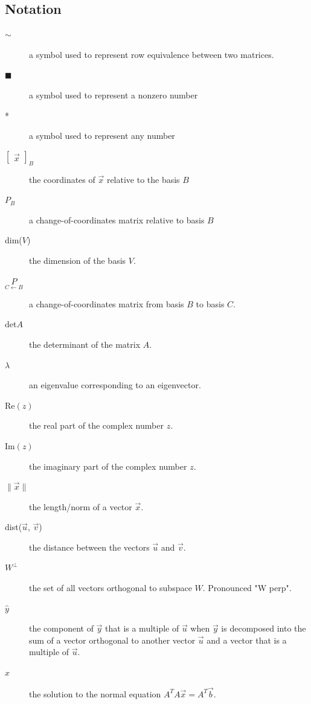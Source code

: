\documentclass[a4paper,12pt]{article}
\theoremstyle{definition}
\theoremstyle{definition}
\newcommand{\basiscoordvec}[2]{
	\begin{bmatrix}
		\vec{#1}
	\end{bmatrix}_#2
}
\newcommand{\chngbasismat}[2]{
	\underset{#2 \leftarrow #1}{P}
}
\newcommand{\norm}[1]{\lVert #1 \rVert}
\newcommand{\normvec}[1]{\norm{\vec{#1}}}
\newcommand{\normaleq}{A^TA\vec{x} = A^T\vec{b}}
\begin{document}
	\subsection{Notation}
	\begin{description}
		\item[$\sim$] a symbol used to represent row equivalence between two matrices.
		
		\item[$\blacksquare$] a symbol used to represent a nonzero number
		
		\item[*] a symbol used to represent any number
		
		\item[$\basiscoordvec{x}{B}$] the coordinates of $\vec{x}$ relative to the basis $B$
		
		\item[$P_B$] a change-of-coordinates matrix relative to basis $B$
		
		\item[dim($V$)] the dimension of the basis $V$.
		
		\item[$\chngbasismat{B}{C}$] a change-of-coordinates matrix from basis $B$ to basis $C$.
		
		\item[det$A$] the determinant of the matrix $A$.
		
		\item[$\lambda$] an eigenvalue corresponding to an eigenvector.
		
		\item[Re$(z)$] the real part of the complex number $z$.
		
		\item[Im$(z)$] the imaginary part of the complex number $z$.
		
		\item[$\normvec{x}$] the length/norm of a vector $\vec{x}$.
		
		\item[dist($\vec{u}$, $\vec{v}$)] the distance between the vectors $\vec{u}$ and $\vec{v}$.
		
		\item[$W^\perp$] the set of all vectors orthogonal to subspace $W$. Pronounced "W perp".
		
		\item[$\hat{y}$] the component of $\vec{y}$ that is a multiple of $\vec{u}$ when $\vec{y}$ is decomposed into the sum of a vector orthogonal to another vector $\vec{u}$ and a vector that is a multiple of $\vec{u}$.
		
		\item[$\hat{x}$] the solution to the normal equation $\normaleq$.
	\end{description}
	
\end{document}

